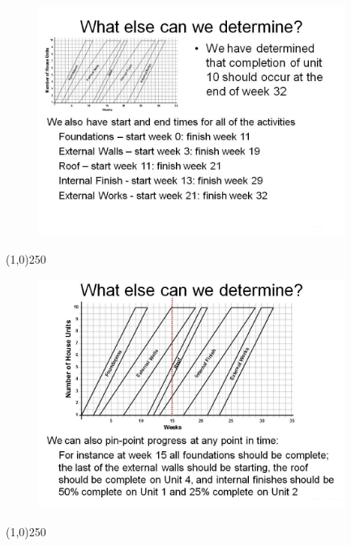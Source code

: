 \begin{frame}
\begin{figure}
	\centering
		\includegraphics[width = 10.0cm]{oldnotes/Slide267.jpg}
\end{figure}
\end{frame}
\begin{center}\line(1,0){250}\end{center}






\begin{frame}
\begin{figure}
	\centering
		\includegraphics[width = 10.0cm]{oldnotes/Slide268.jpg}
\end{figure}
\end{frame}
\begin{center}\line(1,0){250}\end{center}






